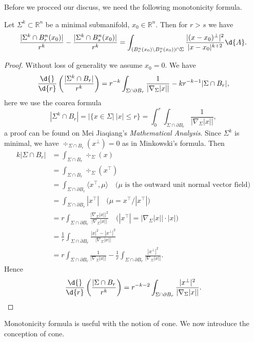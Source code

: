Before we procced our discuss, we need the following monotonicity formula.
\begin{thm}
    Let $\Sigma^k\subset\mathbb{R}^n$ be a minimal submanifold, $x_0\in\mathbb{R}^n$.
    Then for $r>s$ we have
    \[\frac{|\Sigma^k\cap B^n_r(x_0)|}{r^k}-\frac{|\Sigma^k\cap B^n_s(x_0)|}{r^k}=\int_{(B^n_r(x_0)\backslash B^n_s(x_0))\cap\Sigma}\frac{|(x-x_0)^\perp|^2}{|x-x_0|^{k+2}}\d{A}.\]
\end{thm}
\begin{proof}
    Without loss of generality we assume $x_0=0$.
    We have
    \[\frac{\d{}}{\d{r}}\left(\frac{|\Sigma^k\cap B_r|}{r^k}\right)=r^{-k}\int_{\Sigma\cap\partial B_r}\frac{1}{|\nabla_\Sigma|x||}-kr^{-k-1}|\Sigma\cap B_r|,\]
    here we use the coarea formula
    \[|\Sigma^k\cap B_r|=|\{x\in\Sigma|\ |x|\leq r\}=\int_0^r\int_{\Sigma\cap\partial B_r}\frac{1}{|\nabla_\Sigma|x||},\]
    a proof can be found on Mei Jiaqiang's \emph{Mathematical Analysis}.
    Since $\Sigma^k$ is minimal, we have $\div\nolimits_{\Sigma\cap B_r}(x^\perp)=0$ as in Minkowski's formula.
    Then
    \begin{align*}
        k|\Sigma\cap B_r|&=\int_{\Sigma\cap B_r}\div\nolimits_{\Sigma}(x)\\
        &=\int_{\Sigma\cap B_r}\div\nolimits_{\Sigma}(x^\top)\\
        &=\int_{\Sigma\cap\partial B_r}\langle x^\top,\mu\rangle\quad\text{($\mu$ is the outward unit normal vector field)}\\
        &=\int_{\Sigma\cap\partial B_r}|x^\top|\quad\text{($\mu=x^\top/|x^\top|$)}\\
        &=r\int_{\Sigma\cap\partial B_r}\frac{|\nabla_\Sigma|x||^2}{|\nabla_\Sigma|x||}\quad\text{($|x^\top|=|\nabla_\Sigma|x||\cdot|x|$)}\\
        &=\frac{1}{r}\int_{\Sigma\cap\partial B_r}\frac{|x|^2-|x^\perp|^2}{|\nabla_\Sigma|x||}\\
        &=r\int_{\Sigma\cap\partial B_r}\frac{1}{|\nabla_\Sigma|x||}-\frac{1}{r}\int_{\Sigma\cap\partial B_r}\frac{|x^\perp|^2}{|\nabla_\Sigma|x||}.
    \end{align*}
    Hence
    \[\frac{\d{}}{\d{r}}\left(\frac{|\Sigma\cap B_r}{r^k}\right)=r^{-k-2}\int_{\Sigma\cap\partial B_r}\frac{|x^\perp|^2}{|\nabla_\Sigma|x||}.\qedhere\]
\end{proof}

Monotonicity formula is useful with the notion of cone.
We now introduce the conception of cone.


